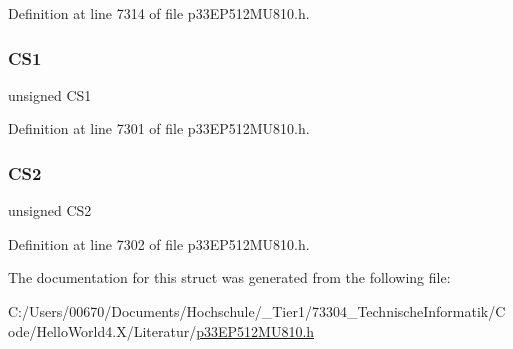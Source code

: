 Definition at line 7314 of file p33\+E\+P512\+M\+U810.\+h.

\mbox{\label{structtag_p_m_a_d_d_r_b_i_t_s_aa09f7cd5c3d252070a01179a98c378b8}} 
\subsubsection{\texorpdfstring{C\+S1}{CS1}}
{\footnotesize\ttfamily unsigned C\+S1}



Definition at line 7301 of file p33\+E\+P512\+M\+U810.\+h.

\mbox{\label{structtag_p_m_a_d_d_r_b_i_t_s_a82995279277458a239760ec933372aa3}} 
\subsubsection{\texorpdfstring{C\+S2}{CS2}}
{\footnotesize\ttfamily unsigned C\+S2}



Definition at line 7302 of file p33\+E\+P512\+M\+U810.\+h.



The documentation for this struct was generated from the following file\+:\begin{DoxyCompactItemize}
\item 
C\+:/\+Users/00670/\+Documents/\+Hochschule/\+\_\+\+Tier1/73304\+\_\+\+Technische\+Informatik/\+Code/\+Hello\+World4.\+X/\+Literatur/\hyperlink{p33_e_p512_m_u810_8h}{p33\+E\+P512\+M\+U810.\+h}\end{DoxyCompactItemize}
